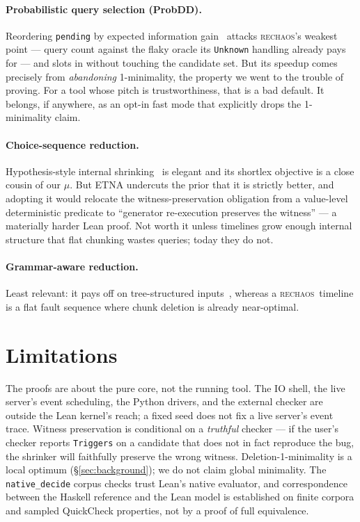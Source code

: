 \documentclass[10pt,twocolumn,letterpaper]{article}
\newcommand{\rc}{\textsc{rechaos}}
\begin{document}
\paragraph{Probabilistic query selection (ProbDD).}
Reordering \texttt{pending} by expected information gain~\cite{wang2021probdd}
attacks \rc's weakest point --- query count against the flaky oracle its
\texttt{Unknown} handling already pays for --- and slots in without touching the
candidate set. But its speedup comes precisely from \emph{abandoning}
1-minimality, the property we went to the trouble of proving. For a tool whose
pitch is trustworthiness, that is a bad default. It belongs, if anywhere, as an
opt-in fast mode that explicitly drops the 1-minimality claim.

\paragraph{Choice-sequence reduction.}
Hypothesis-style internal shrinking~\cite{maciver2020hypothesis} is elegant and
its shortlex objective is a close cousin of our $\mu$. But ETNA undercuts the
prior that it is strictly better, and adopting it would relocate the
witness-preservation obligation from a value-level deterministic predicate to
``generator re-execution preserves the witness'' --- a materially harder Lean
proof. Not worth it unless timelines grow enough internal structure that flat
chunking wastes queries; today they do not.

\paragraph{Grammar-aware reduction.} Least relevant: it pays off on
tree-structured inputs~\cite{misherghi2006hdd,sun2018perses}, whereas a \rc\
timeline is a flat fault sequence where chunk deletion is already near-optimal.

\section{Limitations}\label{sec:limitations}
The proofs are about the pure core, not the running tool. The IO shell, the live
server's event scheduling, the Python drivers, and the external checker are
outside the Lean kernel's reach; a fixed seed does not fix a live server's event
trace. Witness preservation is conditional on a \emph{truthful} checker --- if
the user's checker reports \texttt{Triggers} on a candidate that does not in fact
reproduce the bug, the shrinker will faithfully preserve the wrong witness.
Deletion-1-minimality is a local optimum (\S\ref{sec:background}); we do not claim
global minimality. The \texttt{native\_decide} corpus checks trust Lean's native
evaluator, and correspondence between the Haskell reference and the Lean model is
established on finite corpora and sampled QuickCheck properties, not by a proof of
full equivalence.
\end{document}
